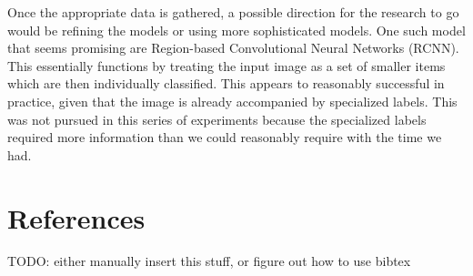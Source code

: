 \documentclass[10pt,Times New Roman]{article}
\begin{document}
Once the appropriate data is gathered, a possible direction for the research to go would be
refining the models or using more sophisticated models. One such model that seems promising
are Region-based Convolutional Neural Networks (RCNN). This essentially functions by treating
the input image as a set of smaller items which are then individually classified. This appears
to reasonably successful in practice, given that the image is already accompanied by specialized
labels. This was not pursued in this series of experiments because the specialized labels
required more information than we could reasonably require with the time we had.


\section*{References}
TODO: either manually insert this stuff, or figure out how to use bibtex
\end{document}
